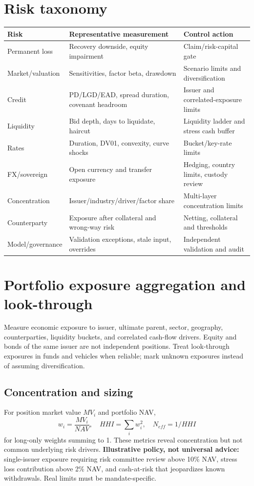 \documentclass[11pt,letterpaper]{article}
\begin{document}
\section{Risk taxonomy}
\begin{center}\small\begin{tabularx}{\textwidth}{>{\raggedright\arraybackslash}p{}>{\raggedright\arraybackslash}X >{\raggedright\arraybackslash}X}\toprule Risk & Representative measurement & Control action \\
\midrule Permanent loss & Recovery downside, equity impairment & Claim/risk-capital gate \\
Market/valuation & Sensitivities, factor beta, drawdown & Scenario limits and diversification \\
Credit & PD/LGD/EAD, spread duration, covenant headroom & Issuer and correlated-exposure limits \\
Liquidity & Bid depth, days to liquidate, haircut & Liquidity ladder and stress cash buffer \\
Rates & Duration, DV01, convexity, curve shocks & Bucket/key-rate limits \\
FX/sovereign & Open currency and transfer exposure & Hedging, country limits, custody review \\
Concentration & Issuer/industry/driver/factor share & Multi-layer concentration limits \\
Counterparty & Exposure after collateral and wrong-way risk & Netting, collateral and thresholds \\
Model/governance & Validation exceptions, stale input, overrides & Independent validation and audit \\
\bottomrule\end{tabularx}\end{center}

\section{Portfolio exposure aggregation and look-through}
Measure economic exposure to issuer, ultimate parent, sector, geography, counterparties, liquidity buckets, and correlated cash-flow drivers. Equity and bonds of the same issuer are not independent positions. Treat look-through exposures in funds and vehicles when reliable; mark unknown exposures instead of assuming diversification.

\subsection{Concentration and sizing}
For position market value $MV_i$ and portfolio NAV,
\[
w_i=\frac{MV_i}{NAV},\quad HHI=\sum_i w_i^2,\quad N_{eff}=1/HHI
\]
for long-only weights summing to 1. These metrics reveal concentration but not common underlying risk drivers. \textbf{Illustrative policy, not universal advice:} single-issuer exposure requiring risk committee review above 10\% NAV, stress loss contribution above 2\% NAV, and cash-at-risk that jeopardizes known withdrawals. Real limits must be mandate-specific.
\end{document}
